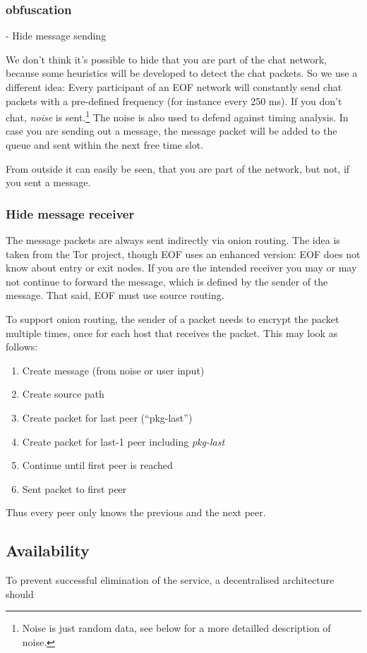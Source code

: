 \subsubsection{obfuscation}
- Hide message sending 

We don't think it's possible to hide that you are part of the chat network,
because some heuristics will be developed to detect the chat packets.
So we use a different idea:
Every participant of an EOF network will constantly send chat packets
with a pre-defined frequency (for instance every 250 ms). 
If you don't chat, \emph{noise} is sent.\footnote{Noise is just random
data, see below for a more detailled description of noise.}
The noise is also used to defend against timing analysis.
In case you are sending out a message, the message packet will be added to the
queue and sent within the next free time slot.

From outside it can easily be seen, that you are part of the network,
but not, if you sent a message.

\subsubsection{Hide message receiver}
The message packets are always sent indirectly via onion routing\cite{onion-1}.
The idea is taken from the Tor project\cite{tor-1}, though EOF uses an enhanced
version: EOF does not know about entry or exit nodes. If you are the intended
receiver you may or may not continue to forward the message, which is defined
by the sender of the message. That said, EOF must use source 
routing\cite{source-routing-1}.

To support onion routing, the sender of a packet needs to encrypt the packet
multiple times, once for each host that receives the packet. This may look
as follows:
\begin{enumerate}
\item Create message (from noise or user input)
\item Create source path
\item Create packet for last peer ("`pkg-last"')
\item Create packet for last-1 peer including \emph{pkg-last}
\item Continue until first peer is reached
\item Sent packet to first peer 
\end{enumerate}
Thus every peer only knows the previous and the next peer.


\subsection{Availability}
To prevent
successful elimination of the service, a decentralised architecture should


